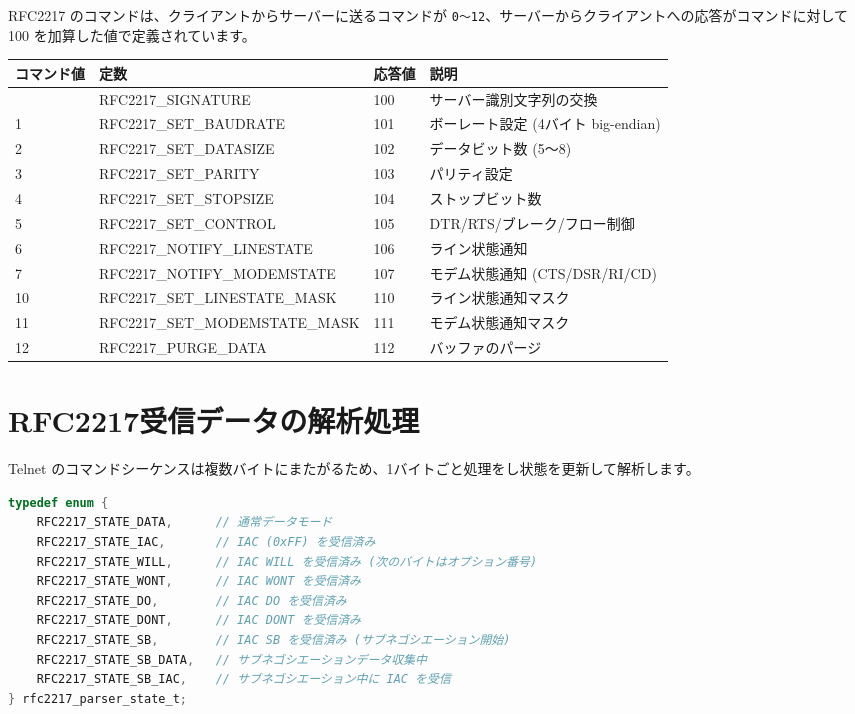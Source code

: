 \documentclass[10pt,twoside,openany,a4j]{ltjsbook}
\newcommand{\passthrough}[1]{#1}
\begin{document}
RFC2217 のコマンドは、クライアントからサーバーに送るコマンドが
\passthrough{\lstinline!0〜12!}、サーバーからクライアントへの応答がコマンドに対して
100 を加算した値で定義されています。

\begin{longtable}[]{@{}llll@{}}
\toprule\noalign{}
コマンド値 & 定数 & 応答値 & 説明 \\
\midrule\noalign{}
\endhead
\bottomrule\noalign{}
\endlastfoot
0 & RFC2217\_SIGNATURE & 100 & サーバー識別文字列の交換 \\
1 & RFC2217\_SET\_BAUDRATE & 101 & ボーレート設定 (4バイト
big-endian) \\
2 & RFC2217\_SET\_DATASIZE & 102 & データビット数 (5〜8) \\
3 & RFC2217\_SET\_PARITY & 103 & パリティ設定 \\
4 & RFC2217\_SET\_STOPSIZE & 104 & ストップビット数 \\
5 & RFC2217\_SET\_CONTROL & 105 & DTR/RTS/ブレーク/フロー制御 \\
6 & RFC2217\_NOTIFY\_LINESTATE & 106 & ライン状態通知 \\
7 & RFC2217\_NOTIFY\_MODEMSTATE & 107 & モデム状態通知
(CTS/DSR/RI/CD) \\
10 & RFC2217\_SET\_LINESTATE\_MASK & 110 & ライン状態通知マスク \\
11 & RFC2217\_SET\_MODEMSTATE\_MASK & 111 & モデム状態通知マスク \\
12 & RFC2217\_PURGE\_DATA & 112 & バッファのパージ \\
\end{longtable}

\section{RFC2217受信データの解析処理}\label{rfc2217ux53d7ux4fe1ux30c7ux30fcux30bfux306eux89e3ux6790ux51e6ux7406}

Telnet
のコマンドシーケンスは複数バイトにまたがるため、1バイトごと処理をし状態を更新して解析します。

\begin{lstlisting}[language=C]
typedef enum {
    RFC2217_STATE_DATA,      // 通常データモード
    RFC2217_STATE_IAC,       // IAC (0xFF) を受信済み
    RFC2217_STATE_WILL,      // IAC WILL を受信済み (次のバイトはオプション番号)
    RFC2217_STATE_WONT,      // IAC WONT を受信済み
    RFC2217_STATE_DO,        // IAC DO を受信済み
    RFC2217_STATE_DONT,      // IAC DONT を受信済み
    RFC2217_STATE_SB,        // IAC SB を受信済み (サブネゴシエーション開始)
    RFC2217_STATE_SB_DATA,   // サブネゴシエーションデータ収集中
    RFC2217_STATE_SB_IAC,    // サブネゴシエーション中に IAC を受信
} rfc2217_parser_state_t;
\end{lstlisting}
\end{document}

